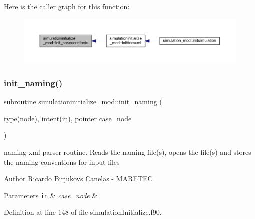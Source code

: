 Here is the caller graph for this function\+:\nopagebreak
\begin{figure}[H]
\begin{center}
\leavevmode
\includegraphics[width=350pt]{namespacesimulationinitialize__mod_ae41256ca5e72ebf27660ffdfe5c08e46_icgraph}
\end{center}
\end{figure}
\mbox{\label{namespacesimulationinitialize__mod_a4909cc4cb57549e6eed3f69d6dfa30b5}} 
\subsubsection{\texorpdfstring{init\+\_\+naming()}{init\_naming()}}
{\footnotesize\ttfamily subroutine simulationinitialize\+\_\+mod\+::init\+\_\+naming (\begin{DoxyParamCaption}\item[{type(node), intent(in), pointer}]{case\+\_\+node }\end{DoxyParamCaption})\hspace{0.3cm}{\ttfamily [private]}}



naming xml parser routine. Reads the naming file(s), opens the file(s) and stores the naming conventions for input files 

\begin{DoxyAuthor}{Author}
Ricardo Birjukovs Canelas -\/ M\+A\+R\+E\+T\+EC 
\end{DoxyAuthor}

\begin{DoxyParams}[1]{Parameters}
\mbox{\tt in}  & {\em case\+\_\+node} & \\
\hline
\end{DoxyParams}


Definition at line 148 of file simulation\+Initialize.\+f90.


